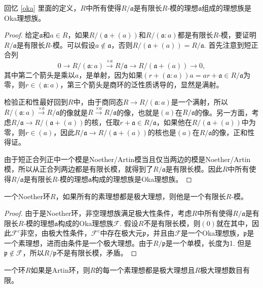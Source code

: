 \begin{lem}
回忆 \ref{oka} 里面的定义，$R$中所有使得$R/\mathfrak{a}$是有限长$R$-模的理想$\mathfrak{a}$组成的理想族是Oka理想族。
\end{lem}

\begin{proof} 
	给定$\mathfrak{a}$和$a\in R$，如果$R/(\mathfrak{a}+(a))$和$R/(\mathfrak{a}:a)$都是有限长$R$-模，要证明$R/\mathfrak{a}$是有限长$R$-模。可以假设$a\not\in \mathfrak{a}$，否则$R/(\mathfrak{a}+(a))=R/\mathfrak{a}$. 首先注意到短正合列
	\[
		0\to R/(\mathfrak{a}:a)\xrightarrow{\times a} R/\mathfrak{a} \to R/(\mathfrak{a}+(a))\to 0,
	\]
	其中第二个箭头是乘以$a$，是单射，因为如果$(r+(\mathfrak{a}:a))a=ar+\mathfrak{a}\in R/\mathfrak{a}$为零，则$r\in (\mathfrak{a}:a)$，第三个箭头是商环的泛性质诱导的，显然是满射。

	检验正和性最好回到$R$中，由于商同态$R\to R/(\mathfrak{a}:a)$是一个满射，所以$R/(\mathfrak{a}:a)\xrightarrow{\times a} R/\mathfrak{a}$的像就是$R\xrightarrow{\times a} R/\mathfrak{a}$的像，也就是$(a)$在$R/\mathfrak{a}$的像。另一方面，考虑$R/\mathfrak{a} \to R/(\mathfrak{a}+(a))$的核，任取$r+\mathfrak{a}\in R/\mathfrak{a}$，如果他在$R/(\mathfrak{a}+(a))$中为零，则$r\in (a)$，因此$R/\mathfrak{a} \to R/(\mathfrak{a}+(a))$的核也是$(a)$在$R/\mathfrak{a}$的像，正和性得证。

	由于短正合列正中一个模是Noether/Artin模当且仅当两边的模是Noether/Artin模，所以从正合列两边都是有限长模，就得到了$R/\mathfrak{a}$是有限长模。因此$R$中所有使得$R/\mathfrak{a}$是有限长$R$-模的理想$\mathfrak{a}$构成的理想族是Oka理想族。
\end{proof}

\begin{pro}
一个Noether环$R$，如果所有的素理想都是极大理想，则他是一个有限长$R$-模。
\end{pro}

\begin{proof}
	由于是Noether环，非空理想族满足极大性条件，考虑$R$中所有使得$R/\mathfrak{a}$是有限长$R$-模的理想$\mathfrak{a}$构成的Oka理想族$\mathcal{F}$. 假设$R$不是有限长模，则$(0)$就在其中，因此$\mathcal{F}^c$非空，由极大性条件，$\mathcal{F}^c$中存在极大元$\mathfrak{p}$，并且由$\mathcal{F}$是一个Oka理想族，$\mathfrak{p}$是一个素理想，进而由条件是一个极大理想。由于$R/\mathfrak{p}$是一个单模，长度为1. 但是$\mathfrak{p}\not\in \mathcal{F}$，所以$R/\mathfrak{p}$不是有限长模，矛盾。
\end{proof}

\begin{pro}
一个环$R$如果是Artin环，则$R$的每一个素理想都是极大理想且$R$极大理想数目有限。

\end{pro}

